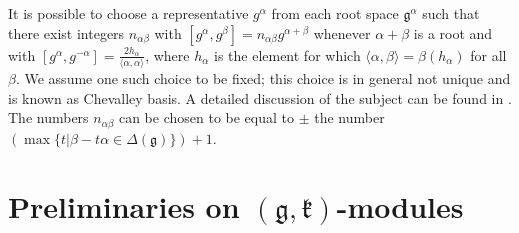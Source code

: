 \documentclass[12pt]{report}
\newcommand{\kk}{\mathfrak{k}}
\newcommand{\gG}{\mathfrak{g}}
\begin{document}
It is possible to choose a representative $g^\alpha$ from each root space $\gG^\alpha$ such that there exist integers $n_{\alpha\beta}$ with $[g^\alpha,g^\beta]=n_{\alpha\beta}g^{\alpha+\beta}$ whenever $\alpha+\beta$ is a root and with $[g^\alpha,g^{-\alpha}] =\frac{2h_{\alpha}} {\langle \alpha,\alpha\rangle}$, where $h_\alpha$ is the element for which $\langle\alpha,\beta\rangle=\beta(h_\alpha)$ for all $\beta$. We assume one such choice to be fixed; this choice is in general not unique and is known as Chevalley basis. A detailed discussion of the subject can be found in \cite[\S 2.8, 2.9]{Samelson}. The numbers $n_{\alpha\beta}$ can be chosen to be equal to $\pm$ the number $(\max \{t|\beta-t\alpha\in\Delta(\gG)\})+1$.

\chapter{Preliminaries on $(\gG,\kk)$-modules}\label{chapterPreliminaries}
\end{document}
